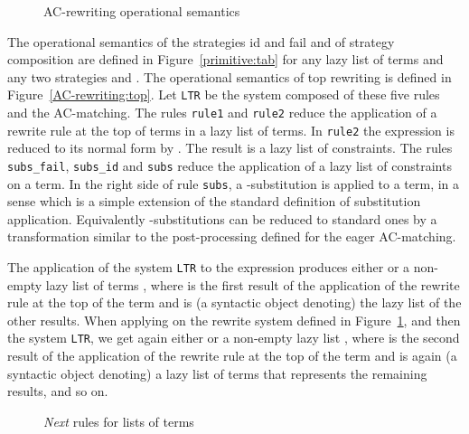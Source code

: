 \documentclass[submission,copyright,creativecommons]{eptcs}
\newcommand \lazy{}
\numberwithin{subcase}{case}
\begin{document}
\begin{figure}[bht!]
\setlength{\abovecaptionskip}{-0.3cm}


\caption{AC-rewriting operational semantics}
\end{figure}


The operational semantics of the strategies \textsf{id} and \textsf{fail} and of
strategy composition are defined in Figure~\ref{primitive:tab} for any lazy list
of terms  and any two strategies  and . The operational semantics of
top rewriting is defined in Figure~\ref{AC-rewriting:top}. Let \texttt{LTR} be
the system composed of these five rules and the \lazy AC-matching. The rules
\texttt{rule1} and \texttt{rule2} reduce the application of a rewrite rule at the top of terms in a lazy list of
terms. In \texttt{rule2} the expression  is reduced to its
normal form by \lazy. The result is a lazy list of constraints.
 The rules
\texttt{subs\_fail}, \texttt{subs\_id} and \texttt{subs} reduce the application
of a lazy list of constraints on a term. In the right side of rule
\texttt{subs},  a -substitution  is applied to a term, in a
sense which is a simple extension of the standard definition of substitution
application. Equivalently -substitutions can be reduced to standard ones
by a transformation similar to the post-processing  defined for the eager
AC-matching.

 The application of the system
\texttt{LTR} to the expression  produces either
 or a non-empty lazy list of terms ,
where  is the first result of the application of the rewrite rule  at the top of the
term  and  is (a syntactic object denoting) the lazy list of the
other results. When applying on  the rewrite system defined in
Figure~\ref{Next:term},
 and then the system \texttt{LTR}, we get again
either  or a non-empty lazy list , where  is
the second result of the application of the rewrite rule  at the top of the
term  and  is again (a syntactic object denoting) a lazy list of
terms that represents the remaining results, and so on. 

\begin{figure}[hbt!]

\caption{\textit{Next} rules for lists of terms\label{Next:term}}
\end{figure}
\end{document}
